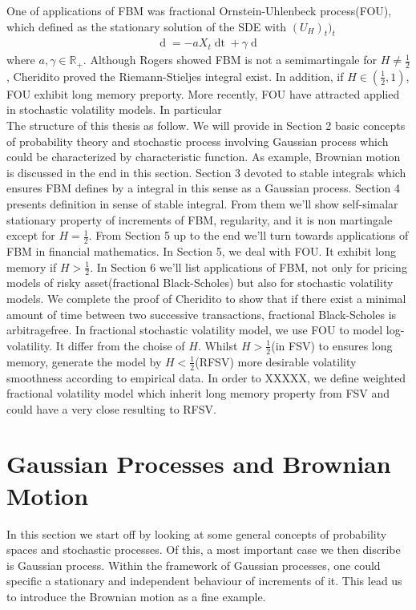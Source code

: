\documentclass[a4paper, twoside, 11pt]{article}
\theoremstyle{definition}
\begin{document}
One of applications of FBM was fractional Ornstein-Uhlenbeck process(FOU), which defined as the stationary solution of the SDE with $(U_H)_t)_t$
\begin{eqnarray*}
  \mathop{dX_t} = -aX_t\mathop{dt} + \gamma\mathop{dU_H(t)}
\end{eqnarray*}
where $a,\gamma \in \mathbb{R}_+$. Although Rogers showed FBM is not a semimartingale for $H\neq \frac{1}{2}$, Cheridito proved the Riemann-Stieljes integral exist. In addition, if $H\in(\frac{1}{2}, 1)$, FOU exhibit long memory preporty. More recently, FOU have attracted applied in stochastic volatility models. In particular \\

The structure of this thesis as follow. We will provide in Section 2 basic concepts of probability theory and stochastic process involving Gaussian process which could be characterized by characteristic function. As example, Brownian motion is discussed in the end in this section. Section 3 devoted to stable integrals which ensures FBM defines by a integral in this sense as a Gaussian process. Section 4 presents definition in sense of stable integral. From them we'll show self-simalar stationary property of increments of FBM, regularity, and it is non martingale except for $H=\frac{1}{2}$. From Section 5 up to the end we'll turn towards applications of FBM in financial mathematics. In Section 5, we deal with FOU. It exhibit long memory if $H > \frac{1}{2}$. In Section 6 we'll list applications of FBM, not only for pricing models of risky asset(fractional Black-Scholes)  but also for stochastic volatility models. We complete the proof of Cheridito to show that if there exist a minimal amount of time between two successive transactions, fractional Black-Scholes is arbitragefree. In fractional stochastic volatility model, we use FOU to model log-volatility. It differ from the choise of $H$. Whilst $H>\frac{1}{2}$(in FSV) to ensures long memory, generate the model by $H<\frac{1}{2}$(RFSV)  more desirable volatility smoothness according to empirical data. In order to XXXXX, we define weighted fractional volatility model which inherit long memory property from FSV and could have a very close resulting to RFSV.

\newpage

\section{Gaussian Processes and Brownian Motion}
\setcounter{equation}{0}
In this section we start off by looking at some general concepts of probability spaces and stochastic processes. Of this, a most important case we then discribe is Gaussian process. Within the framework of Gaussian processes, one could specific a stationary and independent behaviour of increments of it. This lead us to introduce the Brownian motion as a fine example.
\end{document}
